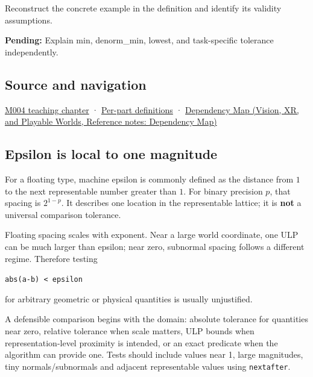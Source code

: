 Reconstruct the concrete example in the definition and identify its validity assumptions.

\textbf{Pending:} Explain min, denorm\_min, lowest, and task-specific tolerance independently.

\subsection{Source and navigation}\label{appendix-390ea641da54-source-and-navigation}

\hyperref[01-foundations-i-ch001-a-stretching-ruler-for-real-valued-quantities]{M004 teaching chapter} · \hyperref[appendix-fd090d982a15-m004---parts-61-76]{Per-part definitions} · \href{../07-Vision-XR-and-Playable-Worlds/main.pdf\#nameddest=appendix-4ad47bdd269a}{Dependency Map (Vision, XR, and Playable Worlds, Reference notes: Dependency Map)}

\subsection{Epsilon is local to one magnitude}\label{appendix-390ea641da54-epsilon-is-local-to-one-magnitude}

For a floating type, machine epsilon is commonly defined as the distance from \(1\) to the next representable number greater than \(1\). For binary precision \(p\), that spacing is \(2^{1-p}\). It describes one location in the representable lattice; it is \textbf{not} a universal comparison tolerance.

Floating spacing scales with exponent. Near a large world coordinate, one ULP can be much larger than epsilon; near zero, subnormal spacing follows a different regime. Therefore testing

\texttt{abs(a-b)\ \textless{}\ epsilon}

for arbitrary geometric or physical quantities is usually unjustified.

A defensible comparison begins with the domain: absolute tolerance for quantities near zero, relative tolerance when scale matters, ULP bounds when representation-level proximity is intended, or an exact predicate when the algorithm can provide one. Tests should include values near 1, large magnitudes, tiny normals/subnormals and adjacent representable values using \texttt{nextafter}.
